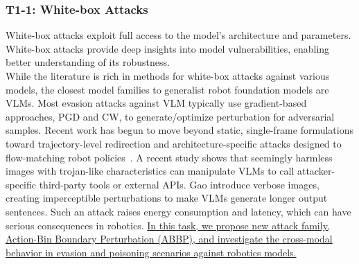 \subsubsection{T1-1: White-box Attacks} \label{sec:t1_1}

White-box attacks exploit full access to the model's architecture and parameters.
White-box attacks provide deep insights into model vulnerabilities, enabling better understanding of its robustness.%
\\
 While the literature is rich in methods for white-box attacks against various models, the closest model families to generalist robot foundation models are VLMs.
Most evasion attacks against VLM \cite{schlarmann2023adversarial, bailey2023image,gao2024adversarial,wang2024stop,tan2024wolf} typically use gradient-based approaches, \eg PGD and CW, to generate/optimize perturbation for adversarial samples.
Recent work has begun to move beyond static, single-frame formulations toward trajectory-level redirection and architecture-specific attacks designed to flow-matching robot policies~\cite{puthumanaillam2026trajectory,tae2026drift}.
A recent study \cite{fu2023misusing} shows that seemingly harmless images with trojan-like characteristics can manipulate VLMs to call attacker-specific third-party tools or external APIs. 
Gao \etal \cite{gao2024inducing} introduce verbose images, creating imperceptible perturbations to make VLMs generate longer output sentences. Such an attack raises energy consumption and latency, which can have serious consequences in robotics.
\ul{In this task, we propose new attack family, Action-Bin Boundary Perturbation (ABBP), and investigate the cross-modal behavior in evasion and poisoning scenarios against robotics models.}


